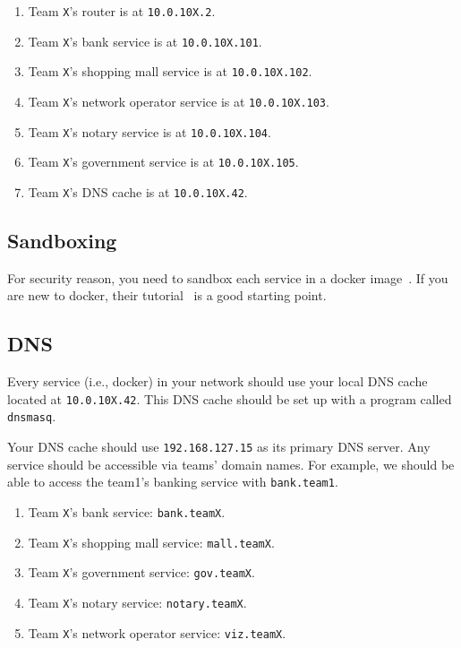 \documentclass[a4paper, 11pt]{article}
\theoremstyle{definition}
\begin{document}
{\begin{enumerate}
%
  \item Team \texttt{X}'s router is at \texttt{10.0.10X.2}.
%
  \item Team \texttt{X}'s bank service is at \texttt{10.0.10X.101}.
%
  \item Team \texttt{X}'s shopping mall service is at
    \texttt{10.0.10X.102}.
%
  \item Team \texttt{X}'s network operator service is at
    \texttt{10.0.10X.103}.
%
  \item Team \texttt{X}'s notary service is at \texttt{10.0.10X.104}.
%
  \item Team \texttt{X}'s government service is at \texttt{10.0.10X.105}.
%
  \item Team \texttt{X}'s DNS cache is at \texttt{10.0.10X.42}.
%
\end{enumerate}

\subsection{Sandboxing}

For security reason, you need to sandbox each service in a docker
image~\cite{docker}. If you are new to docker, their
tutorial~\cite{dockertutorial} is a good starting point.

\subsection{DNS}

Every service (i.e., docker) in your network should use your local DNS
cache located at \texttt{10.0.10X.42}. This DNS cache should be set up
with a program called \texttt{dnsmasq}.

Your DNS cache should use \texttt{192.168.127.15} as its primary DNS
server. Any service should be accessible via teams' domain names. For
example, we should be able to access the team1's banking service with
\texttt{bank.team1}.
\begin{enumerate}
  \item Team \texttt{X}'s bank service: \texttt{bank.teamX}.
  \item Team \texttt{X}'s shopping mall service: \texttt{mall.teamX}.
  \item Team \texttt{X}'s government service: \texttt{gov.teamX}.
  \item Team \texttt{X}'s notary service: \texttt{notary.teamX}.
  \item Team \texttt{X}'s network operator service: \texttt{viz.teamX}.
\end{enumerate}


}
\end{document}
